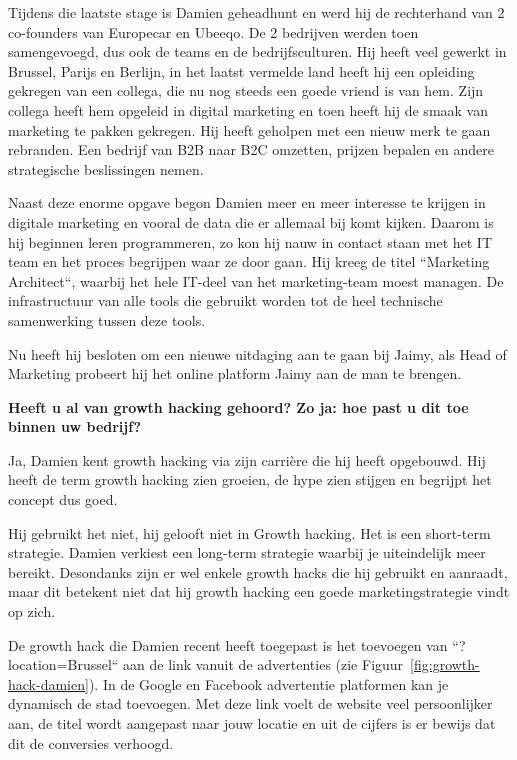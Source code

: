 Tijdens die laatste stage is Damien geheadhunt en werd hij de rechterhand van 2 co-founders van Europecar en Ubeeqo. De 2 bedrijven werden toen samengevoegd, dus ook de teams en de bedrijfsculturen. Hij heeft veel gewerkt in Brussel, Parijs en Berlijn, in het laatst vermelde land heeft hij een opleiding gekregen van een collega, die nu nog steeds een goede vriend is van hem. Zijn collega heeft hem opgeleid in digital marketing en toen heeft hij de smaak van marketing te pakken gekregen. Hij heeft geholpen met een nieuw merk te gaan rebranden. Een bedrijf van B2B naar B2C omzetten, prijzen bepalen en andere strategische beslissingen nemen.

Naast deze enorme opgave begon Damien meer en meer interesse te krijgen in digitale marketing en vooral de data die er allemaal bij komt kijken. Daarom is hij beginnen leren programmeren, zo kon hij nauw in contact staan met het IT team en het proces begrijpen waar ze door gaan. Hij kreeg de titel ``Marketing Architect``, waarbij het hele IT-deel van het marketing-team moest managen. De infrastructuur van alle tools die gebruikt worden tot de heel technische samenwerking tussen deze tools.

Nu heeft hij besloten om een nieuwe uitdaging aan te gaan bij Jaimy, als Head of Marketing probeert hij het online platform Jaimy aan de man te brengen.

\textbf{Heeft u al van growth hacking gehoord? Zo ja: hoe past u dit toe binnen uw bedrijf?}
	
Ja, Damien kent growth hacking via zijn carrière die hij heeft opgebouwd. Hij heeft de term growth hacking zien groeien, de hype zien stijgen en begrijpt het concept dus goed.

Hij gebruikt het niet, hij gelooft niet in Growth hacking. Het is een short-term strategie. Damien verkiest een long-term strategie waarbij je uiteindelijk meer bereikt. Desondanks zijn er wel enkele growth hacks die hij gebruikt en aanraadt, maar dit betekent niet dat hij growth hacking een goede marketingstrategie vindt op zich. 

De growth hack die Damien recent heeft toegepast is het toevoegen van ``?location=Brussel`` aan de link vanuit de advertenties (zie Figuur~\ref{fig:growth-hack-damien}). In de Google en Facebook advertentie platformen kan je dynamisch de stad toevoegen. Met deze link voelt de website veel persoonlijker aan, de titel wordt aangepast naar jouw locatie en uit de cijfers is er bewijs dat dit de conversies verhoogd.

